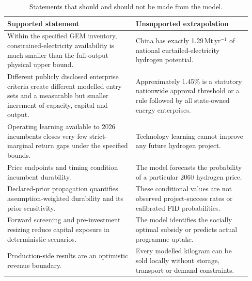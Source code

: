 \documentclass[pdflatex,sn-nature]{sn-jnl}
\begin{document}
\begin{table}[!h]
\caption{Statements that should and should not be made from the model.}\label{tab:claims}
\centering
\footnotesize
\begin{tabularx}{\textwidth}{>{\raggedright\arraybackslash}X>{\raggedright\arraybackslash}X}
\toprule
Supported statement & Unsupported extrapolation \\
\midrule
Within the specified GEM inventory, constrained-electricity availability is much smaller than the full-output physical upper bound. & China has exactly 1.29\,Mt\,yr$^{-1}$ of national curtailed-electricity hydrogen potential. \\
Different publicly disclosed enterprise criteria create different modelled entry sets and a measurable but smaller increment of capacity, capital and output. & Approximately 1.45\% is a statutory nationwide approval threshold or a rule followed by all state-owned energy enterprises. \\
Operating learning available to 2026 incumbents closes very few strict-marginal return gaps under the specified bounds. & Technology learning cannot improve any future hydrogen project. \\
Price endpoints and timing condition incumbent durability. & The model forecasts the probability of a particular 2060 hydrogen price. \\
Declared-prior propagation quantifies assumption-weighted durability and its prior sensitivity. & These conditional values are not observed project-success rates or calibrated FID probabilities. \\
Forward screening and pre-investment resizing reduce capital exposure in deterministic scenarios. & The model identifies the socially optimal subsidy or predicts actual programme uptake. \\
Production-side results are an optimistic revenue boundary. & Every modelled kilogram can be sold locally without storage, transport or demand constraints. \\
\bottomrule
\end{tabularx}
\end{table}
\FloatBarrier
\end{document}
